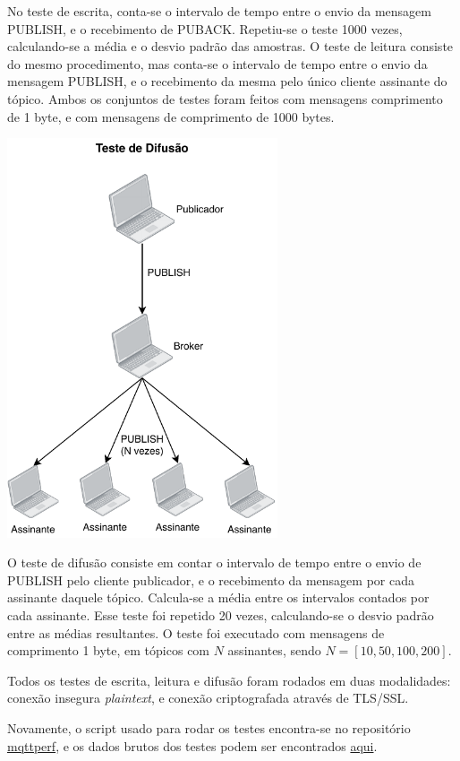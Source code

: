 \documentclass[12pt,a4paper]{article}
\begin{document}
No teste de escrita, conta-se o intervalo de tempo entre o envio da mensagem PUBLISH, e o recebimento de PUBACK. Repetiu-se o teste 1000 vezes, calculando-se a média e o desvio padrão das amostras. O teste de leitura consiste do mesmo procedimento, mas conta-se o intervalo de tempo entre o envio da mensagem PUBLISH, e o recebimento da mesma pelo único cliente assinante do tópico. Ambos os conjuntos de testes foram feitos com mensagens comprimento de 1 byte, e com mensagens de comprimento de 1000 bytes.

\begin{center}
\includegraphics[width=0.6\textwidth]{spread}
\end{center}

O teste de difusão consiste em contar o intervalo de tempo entre o envio de PUBLISH pelo cliente publicador, e o recebimento da mensagem por cada assinante daquele tópico. Calcula-se a média entre os intervalos contados por cada assinante. Esse teste foi repetido 20 vezes, calculando-se o desvio padrão entre as médias resultantes. O teste foi executado com mensagens de comprimento 1 byte, em tópicos com $N$ assinantes, sendo $N = [10, 50, 100, 200]$.

Todos os testes de escrita, leitura e difusão foram rodados em duas modalidades: conexão insegura \textit{plaintext}, e conexão criptografada através de TLS/SSL.

Novamente, o script usado para rodar os testes encontra-se no repositório \href{https://github.com/batmacumba/mqttperf}{mqttperf}, e os dados brutos dos testes podem ser encontrados \href{https://github.com/batmacumba/mqtt}{aqui}.
\end{document}

